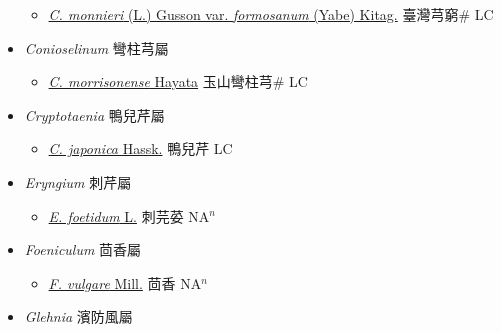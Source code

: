 \begin{itemize}
  \begin{itemize}
        \item[] \href{http://www.theplantlist.org/tpl1.1/search?q=Cnidium+monnieri+var.+formosanum}{\textit{C. monnieri} (L.) Gusson var. \textit{formosanum} (Yabe) Kitag.}   臺灣芎窮\# LC
  \end{itemize}
 \item[] \textit{Conioselinum} 彎柱芎屬
                    
  \begin{itemize}
        \item[] \href{http://www.theplantlist.org/tpl1.1/search?q=Conioselinum+morrisonense}{\textit{C. morrisonense} Hayata}   玉山彎柱芎\# LC
  \end{itemize}
 \item[] \textit{Cryptotaenia} 鴨兒芹屬
                    
  \begin{itemize}
        \item[] \href{http://www.theplantlist.org/tpl1.1/search?q=Cryptotaenia+japonica}{\textit{C. japonica} Hassk.}   鴨兒芹 LC
  \end{itemize}
 \item[] \textit{Eryngium} 刺芹屬
                    
  \begin{itemize}
        \item[] \href{http://www.theplantlist.org/tpl1.1/search?q=Eryngium+foetidum}{\textit{E. foetidum} L.}   刺芫荽 NA$^n$
  \end{itemize}
 \item[] \textit{Foeniculum} 茴香屬
                    
  \begin{itemize}
        \item[] \href{http://www.theplantlist.org/tpl1.1/search?q=Foeniculum+vulgare}{\textit{F. vulgare} Mill.}   茴香 NA$^n$
  \end{itemize}
 \item[] \textit{Glehnia} 濱防風屬
                    

\end{itemize}
